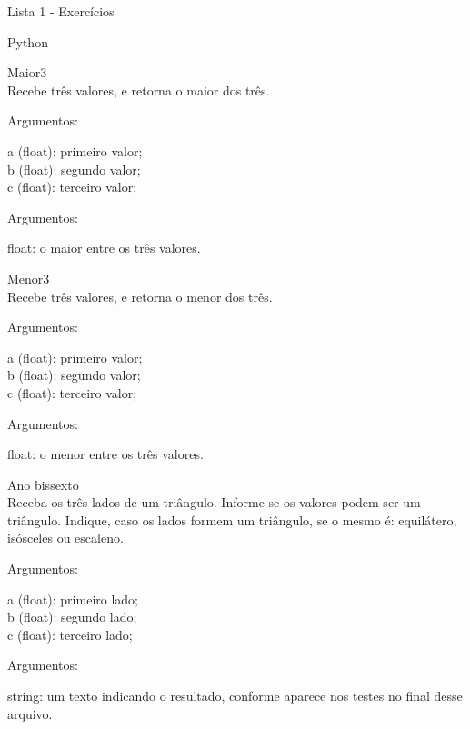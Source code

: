 \documentclass[12pt , a4paper]{article}
\begin{document}
\begin{center}
    {\huge Lista 1 - Exercícios \par}
    {\LARGE Python \par}
\end{center}

\problem Maior3\\ 
Recebe três valores, e retorna o maior dos três.
\begin{adjustwidth}{1cm}{}
Argumentos:
\begin{adjustwidth}{1cm}{}a (float): primeiro valor;\\
b (float): segundo valor;\\
c (float): terceiro valor;
\end{adjustwidth}
Argumentos:
\begin{adjustwidth}{1cm}{}float: o maior entre os três valores.
\end{adjustwidth}
\end{adjustwidth}

\problem Menor3\\ 
Recebe três valores, e retorna o menor dos três.
\begin{adjustwidth}{1cm}{}
Argumentos:
\begin{adjustwidth}{1cm}{}a (float): primeiro valor;\\
b (float): segundo valor;\\
c (float): terceiro valor;
\end{adjustwidth}
Argumentos:
\begin{adjustwidth}{1cm}{}float: o menor entre os três valores.
\end{adjustwidth}
\end{adjustwidth}

\problem Ano bissexto\\ 
Receba os três lados de um triângulo. Informe se os valores podem ser um triângulo. Indique, caso os lados formem um triângulo, se o mesmo é: equilátero, isósceles ou escaleno.
\begin{adjustwidth}{1cm}{}
Argumentos:
\begin{adjustwidth}{1cm}{}a (float): primeiro lado;\\
b (float): segundo lado;\\
c (float): terceiro lado;
\end{adjustwidth}
Argumentos:
\begin{adjustwidth}{1cm}{}string: um texto indicando o resultado,   conforme aparece nos testes no final desse arquivo.
\end{adjustwidth}
\end{adjustwidth}
\end{document}
